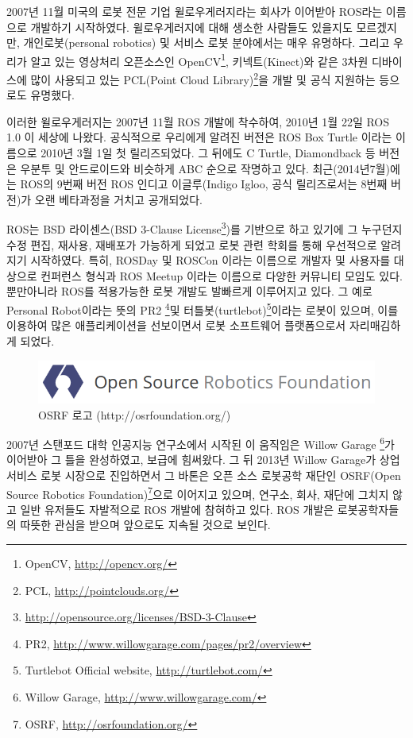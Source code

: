 2007년 11월 미국의 로봇 전문 기업  윌로우게러지라는 회사가 이어받아 ROS라는 이름으로 개발하기 시작하였다. 윌로우게러지에 대해 생소한 사람들도 있을지도 모르겠지만, 개인로봇(personal robotics) 및 서비스 로봇 분야에서는 매우 유명하다. 그리고 우리가 알고 있는 영상처리 오픈소스인 OpenCV\footnote{OpenCV, \url{http://opencv.org/}}, 키넥트(Kinect)와 같은 3차원 디바이스에 많이 사용되고 있는 PCL(Point Cloud Library)\footnote{PCL, \url{http://pointclouds.org/}}을 개발 및 공식 지원하는 등으로도 유명했다. 

이러한 윌로우게러지는 2007년 11월 ROS 개발에 착수하여, 2010년 1월 22일 ROS 1.0 이 세상에 나왔다. 공식적으로 우리에게 알려진 버전은 ROS Box Turtle 이라는 이름으로 2010년 3월 1일 첫 릴리즈되었다. 그 뒤에도 C Turtle, Diamondback 등 버전은 우분투 및 안드로이드와 비슷하게 ABC 순으로 작명하고 있다. 최근(2014년7월)에는 ROS의 9번째 버전 ROS 인디고 이글루(Indigo Igloo, 공식 릴리즈로서는 8번째 버전)가 오랜 베타과정을 거치고 공개되었다. 

ROS는 BSD 라이센스(BSD 3-Clause License\footnote{\url{http://opensource.org/licenses/BSD-3-Clause}})를 기반으로 하고 있기에 그 누구던지 수정 편집, 재사용, 재배포가 가능하게 되었고 로봇 관련 학회를 통해 우선적으로 알려지기 시작하였다. 특히, ROSDay 및 ROSCon 이라는 이름으로 개발자 및 사용자를 대상으로 컨퍼런스 형식과 ROS Meetup 이라는 이름으로 다양한 커뮤니티 모임도 있다. 뿐만아니라 ROS를 적용가능한 로봇 개발도 발빠르게 이루어지고 있다. 그 예로 Personal Robot이라는 뜻의 PR2 \footnote{PR2, \url{http://www.willowgarage.com/pages/pr2/overview}}및 터틀봇(turtlebot)\footnote{Turtlebot Official website, \url{http://turtlebot.com/}}이라는 로봇이 있으며, 이를 이용하여 많은 애플리케이션을 선보이면서 로봇 소프트웨어 플랫폼으로서 자리매김하게 되었다. 

\begin{figure}[h]
\centering\includegraphics[width=\columnwidth]{pictures/chapter1/osrf_logo.png}
\caption{OSRF 로고 (http://osrfoundation.org/)}
\end{figure}

2007년 스탠포드 대학 인공지능 연구소에서 시작된 이 움직임은 Willow Garage \footnote{Willow Garage, \url{http://www.willowgarage.com/}}가 이어받아 그 틀을 완성하였고, 보급에 힘써왔다. 그 뒤 2013년 Willow Garage가 상업 서비스 로봇 시장으로 진입하면서 그 바톤은 오픈 소스 로봇공학 재단인 OSRF(Open Source Robotics Foundation)\footnote{OSRF, \url{http://osrfoundation.org/}}으로 이어지고 있으며, 연구소, 회사, 재단에 그치지 않고 일반 유저들도 자발적으로 ROS 개발에 참혀하고 있다. ROS 개발은 로봇공학자들의 따뜻한 관심을 받으며 앞으로도 지속될 것으로 보인다.

